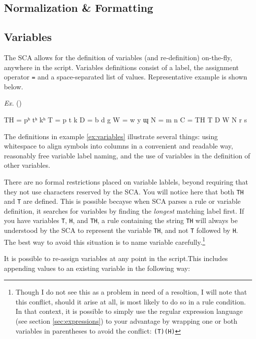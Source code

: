 \documentclass[10pt,letterpaper]{article}
\newcounter{vexcounter}
\newenvironment{vex}[1]{
	\refstepcounter{vexcounter}
	\noindent\emph{Ex.} (\arabic{vexcounter}\label{#1})
	\verbatim
}{
	\endverbatim
}
\begin{document}
\subsection{Normalization \& Formatting}\label{sec:normalization}



\subsection{Variables}\label{sec:variables}
The SCA allows for the definition of variables (and re-definition) on-the-fly, anywhere in the script. Variables definitions consist of a label, the assignment operator \texttt{=} and a space-separated list of values. Representative example is shown below.

\begin{vex}{ex:variables}
TH = pʰ tʰ kʰ
T  = p  t  k
D  = b  d  g
W  = w  y  ɰ
N  = m  n
C  = TH T D W N r s
\end{vex}

The definitions in example \ref{ex:variables} illustrate several things: using whitespace to align symbols into columns in a convenient and readable way, reasonably free variable label naming, and the use of variables in the definition of other variables.

There are no formal restrictions placed on variable lablels, beyond requiring that they not use characters reserved by the SCA. You will notice here that both \texttt{TH} and \texttt{T} are defined. This is possible becayse when SCA parses a rule or variable definition, it searches for variables by finding the \emph{longest} matching label first. If you have variables \texttt{T}, \texttt{H}, and \texttt{TH}, a rule containing the string \texttt{TH} will always be understood by the SCA to represent the variable \texttt{TH}, and not \texttt{T} followed by \texttt{H}. The best way to avoid this situation is to name variable carefully.\footnote{Though I do not see this as a problem in need of a resoltion, I will note that this conflict, should it arise at all, is most likely to do so in a rule condition. In that context, it is possible to simply use the regular expression language (see section \ref{sec:expressions}) to your advantage by wrapping one or both variables in parentheses to avoid the conflict: \texttt{(T)(H)}}

It is possible to re-assign variables at any point in the script.This includes appending values to an existing variable in the following way:
\end{document}
